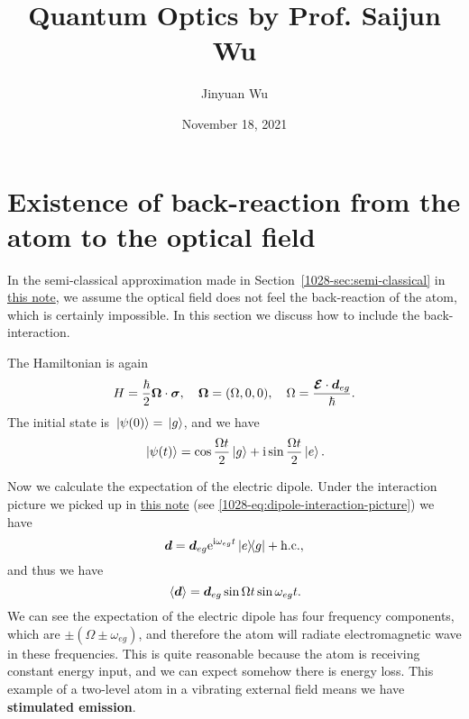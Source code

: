 \documentclass[hyperref, a4paper]{article}
\title{Quantum Optics by Prof. Saijun Wu}
\author{Jinyuan Wu}
\date{November 18, 2021}
\newcommand*{\ii}{\mathrm{i}}
\newcommand*{\ee}{\mathrm{e}}
\newcommand*{\concept}[1]{{\textbf{#1}}}
\newcommand{\atomicintrodoc}{\href{./10-28}{this note}}
\begin{document}
\maketitle

\section{Existence of back-reaction from the atom to the optical field}

In the semi-classical approximation made in Section~\ref{1028-sec:semi-classical} in \atomicintrodoc,
we assume the optical field does not feel the back-reaction of the atom, which is certainly impossible.
In this section we discuss how to include the back-interaction.

The Hamiltonian is again 
\begin{equation}
    H = \frac{\hbar}{2} \vb*{\Omega} \cdot \vb*{\sigma}, \quad \vb*{\Omega} = (\Omega, 0, 0), \quad \Omega = \frac{\vb*{\mathcal{E}} \cdot \vb*{d}_{eg}}{\hbar}.
\end{equation}
The initial state is $\ket*{\psi(0)} = \ket*{g}$, and we have 
\begin{equation}
    \ket*{\psi(t)} = \cos \frac{\Omega t}{2} \ket*{g} + \ii \sin \frac{\Omega t}{2} \ket*{e}.
\end{equation}

Now we calculate the expectation of the electric dipole.
Under the interaction picture we picked up in \atomicintrodoc{} (see \eqref{1028-eq:dipole-interaction-picture})
we have 
\begin{equation}
    \vb*{d} = \vb*{d}_{eg} \ee^{\ii \omega_{eg} t } \dyad*{e}{g} + \text{h.c.},
\end{equation}
and thus we have 
\begin{equation}
    \expval*{\vb*{d}} = \vb*{d}_{eg} \sin \Omega t \sin \omega_{eg} t .
\end{equation}
We can see the expectation of the electric dipole has four frequency components, which are $\pm (\Omega \pm \omega_{eg})$,
and therefore the atom will radiate electromagnetic wave in these frequencies.
This is quite reasonable because the atom is receiving constant energy input, and we can expect somehow there is energy loss.
This example of a two-level atom in a vibrating external field means we have \concept{stimulated emission}.
\end{document}

